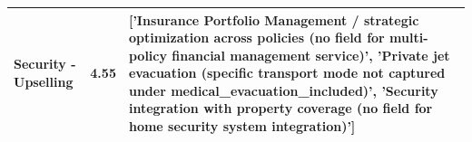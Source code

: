 \begin{table}[h]
\begin{tabular}{lrp{8cm}}
Security - Upselling & 4.55 & ['Insurance Portfolio Management / strategic optimization across policies (no field for multi-policy financial management service)', 'Private jet evacuation (specific transport mode not captured under medical_evacuation_included)', 'Security integration with property coverage (no field for home security system integration)'] \\
\bottomrule
\end{tabular}
\end{table}